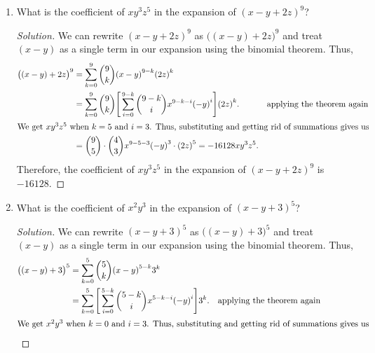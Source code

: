 \documentclass{article}
\newenvironment{solution}
  {\renewcommand\qedsymbol{$\blacksquare$}\begin{proof}[Solution]}
  {\end{proof}}
\begin{document}
\begin{enumerate}
\begin{solution}
\begin{align}
            {\big( x + (y+z) \big)}^3 &= \sum_{k=0}^3 \binom{3}{k} x^{3-k} {(y+z)}^k \notag \\ 
            &= \sum_{k=0}^3 \binom{3}{k} x^{3-k} \Bigg[ \sum_{i=0}^k \binom{k}{i} y^{k-i} z^i \Bigg]. \notag &\text{applying the theorem again} \\ 
            \intertext{We get $xyz$ when $k=2$ and $i=1$. Thus, substituting and getting rid of summations gives us} 
            &= \binom{3}{2} x \cdot \binom{2}{1} yz = 6xyz.  \notag 
        \end{align} Therefore, the coefficient of $xyz$ in the expansion of ${(x+y+z)}^3$ is 6.  
    \end{solution} 
    \item What is the coefficient of $xy^3 z^5$ in the expansion of ${(x-y+2z)}^9$?\begin{solution} 
        We can rewrite ${(x-y+2z)}^9$ as ${\big((x-y)+2z\big)}^9$ and treat $(x-y)$ as a single term in our expansion using the binomial theorem. Thus,\begin{align} 
            {\big((x-y)+2z\big)}^9 &= \sum_{k=0}^9 \binom{9}{k} {(x-y)}^{9-k} {(2z)}^k \notag \\ 
            &= \sum_{k=0}^9 \binom{9}{k} \Bigg[ \sum_{i=0}^{9-k} \binom{9-k}{i} x^{9-k-i} {(-y)}^i \Bigg] {(2z)}^k. \notag &\text{applying the theorem again} \\ 
            \intertext{We get $xy^3 z^5$ when $k=5$ and $i=3$. Thus, substituting and getting rid of summations gives us}
            &= \binom{9}{5} \cdot \binom{4}{3} x^{9-5-3} {(-y)}^3 \cdot {(2z)}^5 = -16128xy^3 z^5. \notag 
        \end{align} Therefore, the coefficient of $xy^3 z^5$ in the expansion of ${(x-y+2z)}^9$ is $-16128$. 
    \end{solution} 
    \item What is the coefficient of $x^2 y^3$ in the expansion of ${(x-y+3)}^5$? \begin{solution} 
        We can rewrite ${(x-y+3)}^5$ as ${\big( (x-y) +3 \big)}^5$ and treat $(x-y)$ as a single term in our expansion using the binomial theorem. Thus,\begin{align} 
            {\big( (x-y) +3 \big)}^5 &= \sum_{k=0}^5 \binom{5}{k} {(x-y)}^{5-k} 3^k \notag \\ 
            &= \sum_{k=0}^5 \Bigg[ \sum_{i=0}^{5-k} \binom{5-k}{i} x^{5-k-i} {(-y)}^i \Bigg] 3^k. \notag &\text{applying the theorem again} \\ 
            \intertext{We get $x^2 y^3$ when $k=0$ and $i=3$. Thus, substituting and getting rid of summations gives us}

\end{align}
\end{solution}
\end{enumerate}
\end{document}
